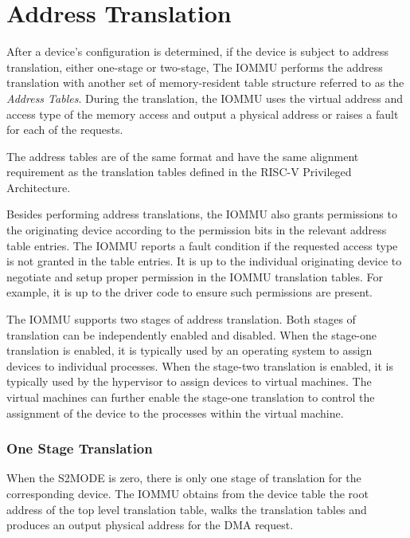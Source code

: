 \section{Address Translation}

After a device's configuration is determined, if the device is subject to address
translation, either one-stage or two-stage, The IOMMU performs the address translation
with another set of memory-resident table structure referred to as the \textit{Address
Tables}. During the translation, the IOMMU uses the virtual address and access type of the
memory access and output a physical address or raises a fault for each of the requests.

The address tables are of the same format and have the same alignment requirement as the
translation tables defined in the RISC-V Privileged Architecture.

Besides performing address translations, the IOMMU also grants permissions to the
originating device according to the permission bits in the relevant address table entries.
The IOMMU reports a fault condition if the requested access type is not granted
in the table entries. It is up to the individual originating device to negotiate and setup
proper permission in the IOMMU translation tables. For example, it is up to the driver
code to ensure such permissions are present. 

The IOMMU supports two stages of address translation. Both stages of translation can be
independently enabled and disabled. When the stage-one translation is enabled, it is
typically used by an operating system to assign devices to individual processes. When the
stage-two translation is enabled, it is typically used by the hypervisor to assign devices
to virtual machines. The virtual machines can further enable the stage-one translation to
control the assignment of the device to the processes within the virtual machine.



\subsubsection{One Stage Translation}

When the S2MODE is zero, there is only one stage of translation for the corresponding
device. The IOMMU obtains from the device table the root address of the top level
translation table, walks the translation tables and produces an output physical address
for the DMA request.

